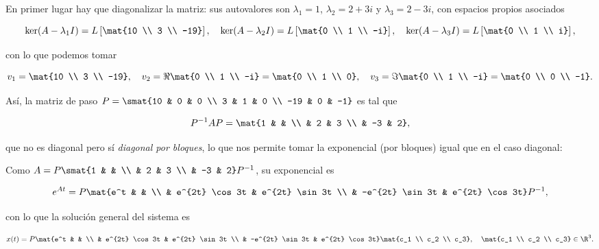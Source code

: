 \documentclass[../ecuaciones_diferenciales.tex]{subfiles}
\begin{document}
\begin{solution}
	En primer lugar hay que diagonalizar la matriz: sus autovalores son
	\(\lambda_1 = 1\), \(\lambda_2 = 2+3i\) y \(\lambda_3 = 2-3i\), con espacios
	propios asociados

	\[\ker(A-\lambda_1 I) = L \left[ \mat{10 \\ 3 \\ -19} \right], \quad
		\ker(A-\lambda_2 I) = L \left[ \mat{0 \\ 1 \\ -i} \right], \quad
		\ker(A-\lambda_3 I) = L \left[\mat{0 \\ 1 \\ i} \right],\]

	con lo que podemos tomar

	\[v_1 = \mat{10 \\ 3 \\ -19}, \quad v_2 = \Re \mat{0 \\ 1 \\ -i} = \mat{0
			\\ 1 \\ 0}, \quad v_3 = \Im \mat{0 \\ 1 \\ -i} = \mat{0 \\ 0 \\ -1}.\]

	Así, la matriz de paso \(P = \smat{10 & 0 & 0 \\ 3 & 1 & 0 \\ -19 & 0 &
		-1}\) es tal que

	\[P^{-1}AP = \mat{1 & & \\ & 2 & 3 \\ & -3 & 2},\]

	que no es diagonal pero sí \emph{diagonal por bloques}, lo que nos permite
	tomar la exponencial (por bloques) igual que en el caso diagonal:

	Como \(A = P \smat{1 & & \\ & 2 & 3 \\ & -3 & 2} P^{-1}\), su exponencial es

	\[e^{At} = P \mat{e^t & & \\ & e^{2t} \cos 3t & e^{2t} \sin 3t \\ &
		-e^{2t} \sin 3t & e^{2t} \cos 3t} P^{-1},\]

	con lo que la solución general del sistema es

	\[x(t) = P \mat{e^t & & \\ & e^{2t} \cos 3t & e^{2t} \sin 3t \\ &
		-e^{2t} \sin 3t & e^{2t} \cos 3t} \mat{c_1 \\ c_2 \\ c_3}, \quad
		\mat{c_1 \\ c_2 \\ c_3} \in \R^3.\]
\end{solution}
\end{document}
